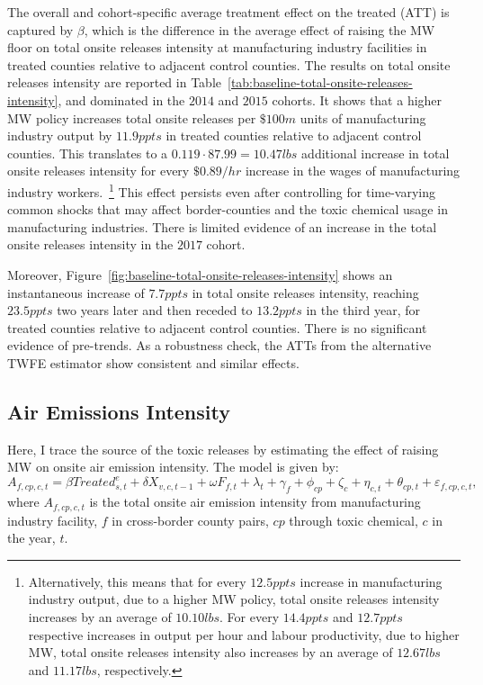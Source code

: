 \documentclass[authoryear, preprint, twocolumn, 1p]{elsarticle}
\begin{document}
    The overall and cohort-specific average treatment effect on the treated (ATT) is captured by $\beta$, which is the difference in the average effect of raising the MW floor on total onsite releases intensity at manufacturing industry facilities in treated counties relative to adjacent control counties. The results on total onsite releases intensity are reported in Table~\ref{tab:baseline-total-onsite-releases-intensity}, and dominated in the $2014$ and $2015$ cohorts. It shows that a higher MW policy increases total onsite releases per $\$100m$ units of manufacturing industry output by $11.9ppts$ in treated counties relative to adjacent control counties. This translates to a $0.119\cdot87.99 = 10.47lbs$ additional increase in total onsite releases intensity for every $\$0.89/hr$ increase in the wages of manufacturing industry workers.~\footnote{\tiny Alternatively, this means that for every $12.5ppts$ increase in manufacturing industry output, due to a higher MW policy, total onsite releases intensity increases by an average of $10.10lbs$. For every $14.4ppts$ and $12.7ppts$ respective increases in output per hour and labour productivity, due to higher MW, total onsite releases intensity also increases by an average of $12.67lbs$ and $11.17lbs$, respectively.} This effect persists even after controlling for time-varying common shocks that may affect border-counties and the toxic chemical usage in manufacturing industries. There is limited evidence of an increase in the total onsite releases intensity in the $2017$ cohort.
    

    Moreover, Figure~\ref{fig:baseline-total-onsite-releases-intensity} shows an instantaneous increase of $7.7ppts$ in total onsite releases intensity, reaching $23.5ppts$ two years later and then receded to $13.2ppts$ in the third year, for treated counties relative to adjacent control counties. There is no significant evidence of pre-trends. As a robustness check, the ATTs from the alternative TWFE estimator show consistent and similar effects.

    \subsection{Air Emissions Intensity}\label{subsec:air-emission-intensity}
    Here, I trace the source of the toxic releases by estimating the effect of raising MW on onsite air emission intensity. The model is given by:
    \begin{equation}
        A_{f,cp,c,t} = \beta Treated_{s,t}^e + \delta X_{v,c,t-1} + \omega F_{f,t} + \lambda_{t} + \gamma_{f} + \phi_{cp} + \zeta_{c} + \eta_{c,t} + \theta_{cp,t} + \varepsilon_{f,cp,c,t},\label{eq:baseline-onsite-air-emission-intensity}
    \end{equation}
    where $A_{f,cp,c,t}$ is the total onsite air emission intensity from manufacturing industry facility, $f$ in cross-border county pairs, $cp$ through toxic chemical, $c$ in the year, $t$.
\end{document}
